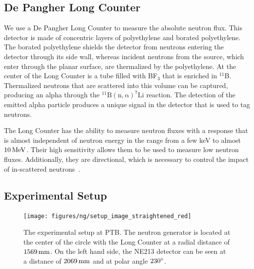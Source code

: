 \subsection{De Pangher Long Counter}
We use a De Pangher Long Counter to measure the absolute neutron flux. This detector is made of concentric layers of polyethylene and borated polyethylene. The borated polyethylene shields the detector from neutrons entering the detector through its side wall, whereas incident neutrons from the source, which enter through the planar surface, are thermalized by the polyethylene. At the center of the Long Counter is a tube filled with BF$_3$ that is enriched in $^{11}$B. Thermalized neutrons that are scattered into this volume can be captured, producing an alpha through the $\mathrm{^{11}B(n, \alpha)^{7}Li}$ reaction. The detection of the emitted alpha particle produces a unique signal in the detector that is used to tag neutrons.

The Long Counter has the ability to measure neutron fluxes with a response that is almost independent of neutron energy in the range from a few keV to almost $10\,\mathrm{MeV}$. Their high sensitivity allows them to be used to measure low neutron fluxes. Additionally, they are directional, which is necessary to control the impact of in-scattered neutrons~\cite{Nolte:2011}.

\subsection{Experimental Setup}

\begin{figure}[!htb]
\centering
    \texttt{[image: figures/ng/setup\_image\_straightened\_red]}
    \caption{The experimental setup at PTB. The neutron generator is located at the center of the circle with the Long Counter at a radial distance of $1569\,\mathrm{mm}$. On the left hand side, the NE213 detector can be seen at a distance of $2069\,\mathrm{mm}$ and at polar angle $230{}^{\circ}$.}\label{fig:ptb_setup}
\end{figure}

